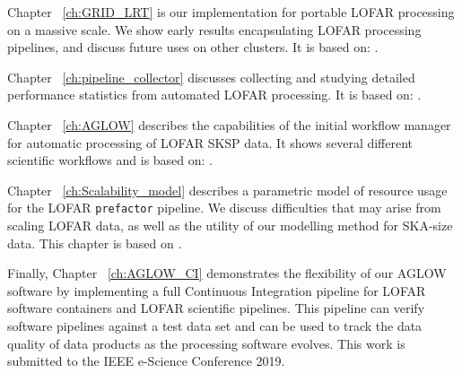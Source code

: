 Chapter ~\ref{ch:GRID_LRT} is our implementation for portable LOFAR processing on a massive scale. We show early results encapsulating LOFAR processing pipelines, and discuss future uses on other clusters. It is based on:  .

Chapter ~\ref{ch:pipeline_collector} discusses collecting and studying detailed performance statistics from automated LOFAR processing. It is based on: .

Chapter ~\ref{ch:AGLOW} describes the capabilities of the initial workflow manager for automatic processing of LOFAR SKSP data. It shows several different scientific workflows and is based on: .

Chapter ~\ref{ch:Scalability_model}  describes a parametric model of resource usage for the LOFAR \texttt{prefactor} pipeline. We discuss difficulties that may arise from scaling LOFAR data, as well as the utility of our modelling method for SKA-size data. This chapter is  based on .

Finally, Chapter ~\ref{ch:AGLOW_CI} demonstrates the flexibility of our AGLOW software by implementing a full Continuous Integration pipeline for LOFAR software containers and LOFAR scientific pipelines. This pipeline can verify software pipelines against a test data set and can be used to track the data quality of data products as the processing software evolves. This work is submitted to the IEEE e-Science Conference 2019.
